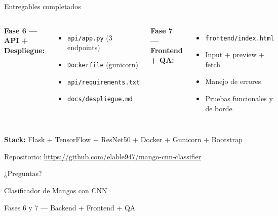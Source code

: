 \documentclass[aspectratio=169]{beamer}
\begin{document}
\begin{frame}{Entregables completados}
  \begin{columns}
    \textbf{Fase 6 — API + Despliegue:}
    \begin{itemize}
      \item[\checkmark] \texttt{api/app.py} (3 endpoints)
      \item[\checkmark] \texttt{Dockerfile} (gunicorn)
      \item[\checkmark] \texttt{api/requirements.txt}
      \item[\checkmark] \texttt{docs/despliegue.md}
    \end{itemize}

    \textbf{Fase 7 — Frontend + QA:}
    \begin{itemize}
      \item[\checkmark] \texttt{frontend/index.html}
      \item[\checkmark] Input + preview + fetch
      \item[\checkmark] Manejo de errores
      \item[\checkmark] Pruebas funcionales y de borde
    \end{itemize}
  \end{columns}

  \vspace{2em}
  \begin{center}
    \Large\textbf{Stack:} Flask + TensorFlow + ResNet50 + Docker + Gunicorn + Bootstrap

    \vspace{1em}
    \normalsize Repositorio: \url{https://github.com/elable947/mango-cnn-classifier}
  \end{center}
\end{frame}

\begin{frame}{¿Preguntas?}
  \centering
  \Huge{🥭}

  \vspace{1em}
  \large Clasificador de Mangos con CNN

  \vspace{0.5em}
  \normalsize Fases 6 y 7 — Backend + Frontend + QA
\end{frame}
\end{document}
